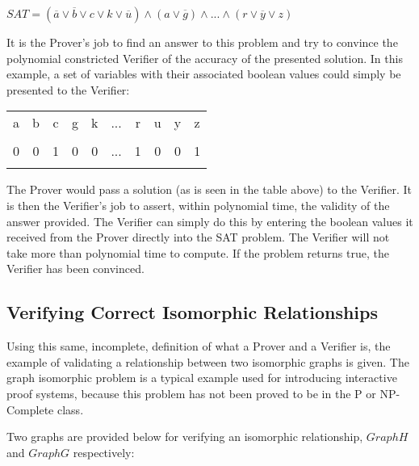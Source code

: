 \documentclass[12pt]{article}
\begin{document}
$SAT \equal (\overline{a} \vee \overline{b} \vee c \vee k \vee \overline{u}) \wedge (a \vee \overline{g}) 
\wedge ... \wedge (r \vee \overline{y} \vee z)$

It is the Prover's job to find an answer to this problem and try to convince the polynomial constricted Verifier of the accuracy of the presented solution. In this example, a set of variables with their associated boolean values could simply be presented to the Verifier:

\begin{center}
\begin{tabular}{|l|c|c|c|c|c|c|c|c|c|}
\hline
  a & b & c & g & k & ... & r & u & y & z \\
   &     &     &     &     &     &     &     &     & \\
\hline
  0  &  0  &  1  &  0  &  0  & ... &  1  &  0  &  0  &  1 \\
      &     &     &     &     &     &     &     &     & \\
\hline
  \end{tabular}
\end{center}

The Prover would pass a solution (as is seen in the table above) to the Verifier. It is then the Verifier's job to assert, within polynomial time, the validity of the answer provided. The Verifier can simply do this by entering the boolean values it received from the Prover directly into the SAT problem. The Verifier will not take more than polynomial time to compute. If the problem returns true, the Verifier has been convinced.

\subsection{Verifying Correct Isomorphic Relationships}
Using this same, incomplete, definition of what a Prover and a Verifier is, the example of validating a relationship between two isomorphic graphs is given. The graph isomorphic problem is a typical example used for introducing interactive proof systems, because this problem has not been proved to be in the P or NP-Complete class.

Two graphs are provided below for verifying an isomorphic relationship, $Graph H$ and $Graph G$ respectively: 
\end{document}
